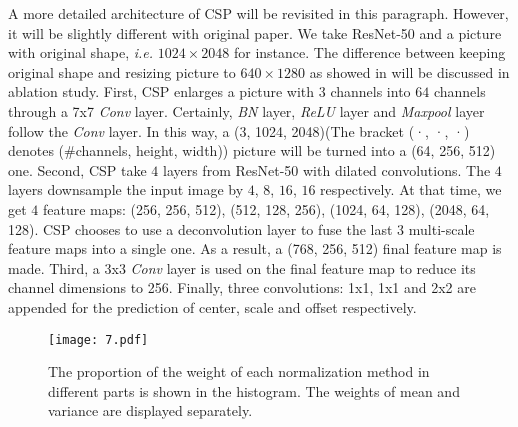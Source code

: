 \documentclass[twocolumn]{article}
\begin{document}
A more detailed architecture of CSP\cite{liu2019high} will be revisited in this paragraph. However, it will be slightly different with original paper\cite{liu2019high}. We take ResNet-50\cite{he2016deep} and a picture with original shape, \textit{i.e.} $1024 \times 2048$ for instance. The difference between keeping original shape and resizing picture to $640 \times 1280$ as showed in \cite{liu2019high} will be discussed in ablation study. First, CSP\cite{liu2019high} enlarges a picture with $3$ channels into $64$ channels through a 7x7 \textit{Conv} layer. Certainly, \textit{BN} layer, \textit{ReLU} layer and \textit{Maxpool} layer follow the \textit{Conv} layer. In this way, a (3, 1024, 2048)(The bracket (·, ·, ·) denotes (\#channels, height, width)) picture will be turned into a (64, 256, 512) one. Second, CSP\cite{liu2019high} take $4$ layers from ResNet-50\cite{he2016deep} with dilated convolutions. The $4$ layers downsample the input image by $4$, $8$, $16$, $16$ respectively. At that time, we get $4$ feature maps: (256, 256, 512), (512, 128, 256), (1024, 64, 128), (2048, 64, 128). CSP\cite{liu2019high} chooses to use a deconvolution layer to fuse the last $3$ multi-scale feature maps into a single one. As a result, a (768, 256, 512) final feature map is made. Third, a 3x3 \textit{Conv} layer is used on the final feature map to reduce its channel dimensions to 256. Finally, three convolutions: 1x1, 1x1 and 2x2 are appended for the prediction of center, scale and offset respectively.
\begin{figure*}[h]
\centering
{}
\texttt{[image: 7.pdf]}
\caption{The proportion of the weight of each normalization method in different parts is shown in the histogram. The weights of mean and variance are displayed separately.}
\label{fig:3}
\end{figure*}
\end{document}
